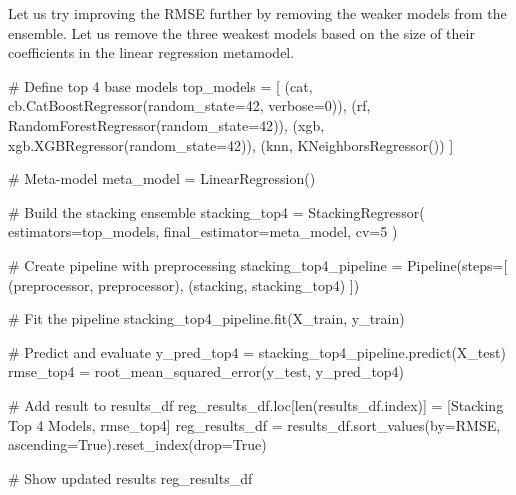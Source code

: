 \documentclass[
  letterpaper,
  DIV=11,
  numbers=noendperiod]{scrreprt}
\newenvironment{Shaded}{\begin{snugshade}}{\end{snugshade}}
\newcommand{\BuiltInTok}[1]{\textcolor[rgb]{0.00,0.23,0.31}{#1}}
\newcommand{\CommentTok}[1]{\textcolor[rgb]{0.37,0.37,0.37}{#1}}
\newcommand{\DecValTok}[1]{\textcolor[rgb]{0.68,0.00,0.00}{#1}}
\newcommand{\NormalTok}[1]{\textcolor[rgb]{0.00,0.23,0.31}{#1}}
\newcommand{\OperatorTok}[1]{\textcolor[rgb]{0.37,0.37,0.37}{#1}}
\newcommand{\StringTok}[1]{\textcolor[rgb]{0.13,0.47,0.30}{#1}}
\newcommand{\VariableTok}[1]{\textcolor[rgb]{0.07,0.07,0.07}{#1}}
\begin{document}
Let us try improving the RMSE further by removing the weaker models from
the ensemble. Let us remove the three weakest models based on the size
of their coefficients in the linear regression metamodel.

\begin{Shaded}
\begin{Highlighting}[]
\CommentTok{\# Define top 4 base models}
\NormalTok{top\_models }\OperatorTok{=}\NormalTok{ [}
\NormalTok{    (}\StringTok{\textquotesingle{}cat\textquotesingle{}}\NormalTok{, cb.CatBoostRegressor(random\_state}\OperatorTok{=}\DecValTok{42}\NormalTok{, verbose}\OperatorTok{=}\DecValTok{0}\NormalTok{)),}
\NormalTok{    (}\StringTok{\textquotesingle{}rf\textquotesingle{}}\NormalTok{, RandomForestRegressor(random\_state}\OperatorTok{=}\DecValTok{42}\NormalTok{)),}
\NormalTok{    (}\StringTok{\textquotesingle{}xgb\textquotesingle{}}\NormalTok{, xgb.XGBRegressor(random\_state}\OperatorTok{=}\DecValTok{42}\NormalTok{)),}
\NormalTok{    (}\StringTok{\textquotesingle{}knn\textquotesingle{}}\NormalTok{, KNeighborsRegressor())}
\NormalTok{]}

\CommentTok{\# Meta{-}model}
\NormalTok{meta\_model }\OperatorTok{=}\NormalTok{ LinearRegression()}

\CommentTok{\# Build the stacking ensemble}
\NormalTok{stacking\_top4 }\OperatorTok{=}\NormalTok{ StackingRegressor(}
\NormalTok{    estimators}\OperatorTok{=}\NormalTok{top\_models,}
\NormalTok{    final\_estimator}\OperatorTok{=}\NormalTok{meta\_model,}
\NormalTok{    cv}\OperatorTok{=}\DecValTok{5}
\NormalTok{)}

\CommentTok{\# Create pipeline with preprocessing}
\NormalTok{stacking\_top4\_pipeline }\OperatorTok{=}\NormalTok{ Pipeline(steps}\OperatorTok{=}\NormalTok{[}
\NormalTok{    (}\StringTok{\textquotesingle{}preprocessor\textquotesingle{}}\NormalTok{, preprocessor),}
\NormalTok{    (}\StringTok{\textquotesingle{}stacking\textquotesingle{}}\NormalTok{, stacking\_top4)}
\NormalTok{])}

\CommentTok{\# Fit the pipeline}
\NormalTok{stacking\_top4\_pipeline.fit(X\_train, y\_train)}

\CommentTok{\# Predict and evaluate}
\NormalTok{y\_pred\_top4 }\OperatorTok{=}\NormalTok{ stacking\_top4\_pipeline.predict(X\_test)}
\NormalTok{rmse\_top4 }\OperatorTok{=}\NormalTok{ root\_mean\_squared\_error(y\_test, y\_pred\_top4)}

\CommentTok{\# Add result to results\_df}
\NormalTok{reg\_results\_df.loc[}\BuiltInTok{len}\NormalTok{(results\_df.index)] }\OperatorTok{=}\NormalTok{ [}\StringTok{\textquotesingle{}Stacking Top 4 Models\textquotesingle{}}\NormalTok{, rmse\_top4]}
\NormalTok{reg\_results\_df }\OperatorTok{=}\NormalTok{ results\_df.sort\_values(by}\OperatorTok{=}\StringTok{\textquotesingle{}RMSE\textquotesingle{}}\NormalTok{, ascending}\OperatorTok{=}\VariableTok{True}\NormalTok{).reset\_index(drop}\OperatorTok{=}\VariableTok{True}\NormalTok{)}

\CommentTok{\# Show updated results}
\NormalTok{reg\_results\_df}
\end{Highlighting}
\end{Shaded}
\end{document}
